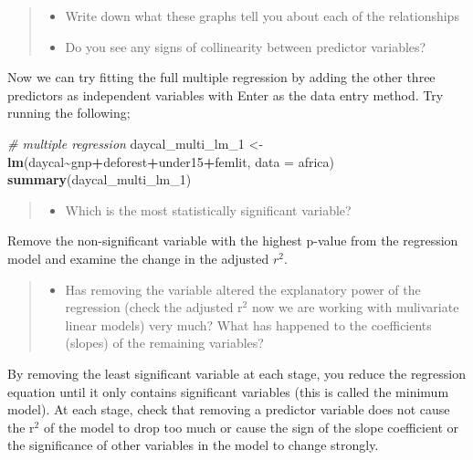 \documentclass[
]{book}
\newenvironment{Shaded}{\begin{snugshade}}{\end{snugshade}}
\newcommand{\AttributeTok}[1]{\textcolor[rgb]{0.13,0.29,0.53}{#1}}
\newcommand{\CommentTok}[1]{\textcolor[rgb]{0.56,0.35,0.01}{\textit{#1}}}
\newcommand{\FunctionTok}[1]{\textcolor[rgb]{0.13,0.29,0.53}{\textbf{#1}}}
\newcommand{\NormalTok}[1]{#1}
\newcommand{\OtherTok}[1]{\textcolor[rgb]{0.56,0.35,0.01}{#1}}
\newcommand{\SpecialCharTok}[1]{\textcolor[rgb]{0.81,0.36,0.00}{\textbf{#1}}}
\providecommand{\tightlist}{%
  \setlength{\itemsep}{0pt}\setlength{\parskip}{0pt}}
\begin{document}
\begin{quote}
\begin{itemize}
\tightlist
\item
  Write down what these graphs tell you about each of the relationships
\item
  Do you see any signs of collinearity between predictor variables?
\end{itemize}
\end{quote}

Now we can try fitting the full multiple regression by adding the other three predictors as independent variables with Enter as the data entry method. Try running the following;

\begin{Shaded}
\begin{Highlighting}[]
\CommentTok{\# multiple regression}
\NormalTok{daycal\_multi\_lm\_1 }\OtherTok{\textless{}{-}} \FunctionTok{lm}\NormalTok{(daycal}\SpecialCharTok{\textasciitilde{}}\NormalTok{gnp}\SpecialCharTok{+}\NormalTok{deforest}\SpecialCharTok{+}\NormalTok{under15}\SpecialCharTok{+}\NormalTok{femlit, }\AttributeTok{data =}\NormalTok{ africa)}
\FunctionTok{summary}\NormalTok{(daycal\_multi\_lm\_1)}
\end{Highlighting}
\end{Shaded}

\begin{quote}
\begin{itemize}
\tightlist
\item
  Which is the most statistically significant variable?
\end{itemize}
\end{quote}

Remove the non-significant variable with the highest p-value from the regression model and examine the change in the adjusted \(r^2\).

\begin{quote}
\begin{itemize}
\tightlist
\item
  Has removing the variable altered the explanatory power of the regression (check the adjusted r\(^2\) now we are working with mulivariate linear models) very much? What has happened to the coefficients (slopes) of the remaining variables?
\end{itemize}
\end{quote}

By removing the least significant variable at each stage, you reduce the regression equation until it only contains significant variables (this is called the minimum model). At each stage, check that removing a predictor variable does not cause the r\(^2\) of the model to drop too much or cause the sign of the slope coefficient or the significance of other variables in the model to change strongly.
\end{document}
